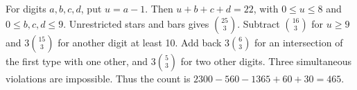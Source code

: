 For digits $ a,b,c,d $, put $ u=a-1 $. Then $ u+b+c+d=22 $, with $ 0\le u\le8 $ and $ 0\le b,c,d\le9 $. Unrestricted stars and bars gives $\binom{25}{3}$. Subtract $\binom{16}{3}$ for $ u\ge9 $ and $ 3\binom{15}{3}$ for another digit at least 10. Add back $ 3\binom63 $ for an intersection of the first type with one other, and $ 3\binom53 $ for two other digits. Three simultaneous violations are impossible. Thus the count is $ 2300-560-1365+60+30=\boxed{465}$.
